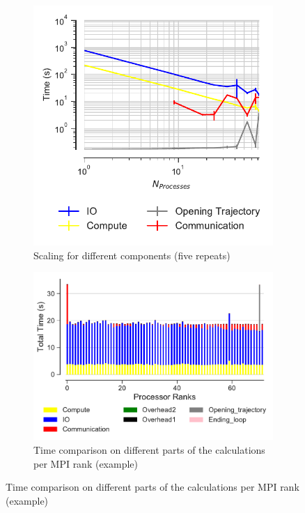 \begin{figure}[ht!]
\begin{subfigure}{.4\textwidth}
  \includegraphics[width=\linewidth]{figures/main-RMSD-time_comp_IO_comparison-Bridges.pdf}
\caption{Scaling for different components (five repeats)}
\label{fig:ScalingComputeIO-Bridges}
\end{subfigure}
\hfill
\begin{subfigure} {.5\textwidth}
  \includegraphics[width=\linewidth]{figures/main-RMSD-BarPlot-rank-comparison_72_4-Bridges.pdf}
  \caption{Time comparison on different parts of the calculations per MPI rank (example)}
  \label{fig:MPIranks-Bridges}
\end{subfigure}


\end{figure}
